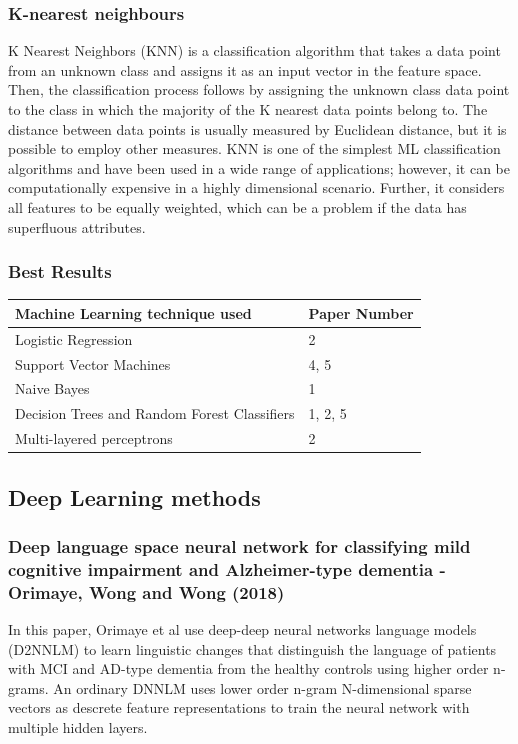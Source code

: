 \documentclass[10pt, letterpaper, twoside, openany]{thesis}
\begin{document}
\subsubsection{K-nearest neighbours}
K Nearest Neighbors (KNN) is a classification algorithm that takes a data point from an unknown class and assigns it as an input vector in the feature space. Then, the classification process follows by assigning the unknown class data point to the class in which the majority of the K nearest data points belong to. The distance between data points is usually measured by Euclidean distance, but it is possible to employ other measures. KNN is one of the simplest ML classification algorithms and have been used in a wide range of applications; however, it can be computationally expensive in a highly dimensional scenario. Further, it considers all features to be equally weighted, which can be a problem if the data has superfluous attributes.

\subsubsection{Best Results}
\begin{table}[H]
	\begin{center}
	\begin{tabular}{ p{6cm} | p{6cm} }
	\hline
	Machine Learning technique used & Paper Number \\ \hline
	Logistic Regression & 2 \\ \hline
	Support Vector Machines & 4, 5 \\ \hline
	Naive Bayes & 1 \\ \hline
	Decision Trees and Random Forest Classifiers & 1, 2, 5 \\ \hline
	Multi-layered perceptrons & 2 \\ \hline
	\hline 
	\end{tabular}
	\end{center}
\end{table}


\subsection{Deep Learning methods}
\subsubsection{Deep language space neural network for classifying mild cognitive impairment and Alzheimer-type dementia - Orimaye, Wong and Wong (2018)}
In this paper, Orimaye et al use deep-deep neural networks language models (D2NNLM) to learn linguistic changes that distinguish the language of patients with MCI and AD-type dementia from the healthy controls using higher order n-grams. An ordinary DNNLM uses lower order n-gram N-dimensional sparse vectors as descrete feature representations to train the neural network with multiple hidden layers.
\end{document}
